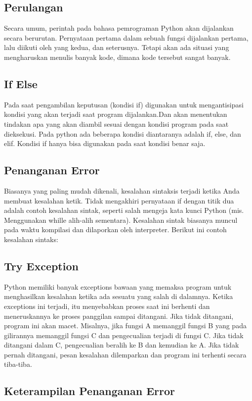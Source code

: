 \begin{enumerate}
\subsection{Perulangan}
Secara umum, perintah pada bahasa pemrograman Python akan dijalankan secara berurutan. Pernyataan pertama dalam sebuah fungsi dijalankan pertama, lalu diikuti oleh yang kedua, dan seterusnya. Tetapi akan ada situasi  yang mengharuskan menulis banyak kode, dimana kode tersebut sangat banyak.

\subsection{If Else}
Pada saat pengambilan keputusan (kondisi if) digunakan untuk mengantisipasi kondisi yang akan terjadi saat program dijalankan.Dan akan menentukan tindakan apa yang akan diambil sesuai dengan kondisi program pada saat dieksekusi. Pada python ada beberapa kondisi diantaranya adalah if, else, dan elif. Kondisi if hanya bisa digunakan pada saat kondisi benar saja.

\subsection{Penanganan Error}
Biasanya yang paling mudah dikenali, kesalahan sintaksis terjadi ketika Anda membuat kesalahan ketik. Tidak mengakhiri pernyataan if dengan titik dua adalah contoh kesalahan sintak, seperti salah mengeja kata kunci Python (mis. Menggunakan whille alih-alih sementara). Kesalahan sintak biasanya muncul pada waktu kompilasi dan dilaporkan oleh interpreter. 
Berikut ini contoh kesalahan sintaks:

\subsection{Try Exception}
Python memiliki banyak exceptions bawaan yang memaksa program untuk menghasilkan kesalahan ketika ada sesuatu yang salah di dalamnya. Ketika exceptions ini terjadi, itu menyebabkan proses saat ini berhenti dan meneruskannya ke proses panggilan sampai ditangani. Jika tidak ditangani, program ini akan macet.
Misalnya, jika fungsi A memanggil fungsi B yang pada gilirannya memanggil fungsi C dan pengecualian terjadi di fungsi C. Jika tidak ditangani dalam C, pengecualian beralih ke B dan kemudian ke A. Jika tidak pernah ditangani, pesan kesalahan dilemparkan dan program ini terhenti secara tiba-tiba.

\end{enumerate}
\subsection{Keterampilan Penanganan Error}
